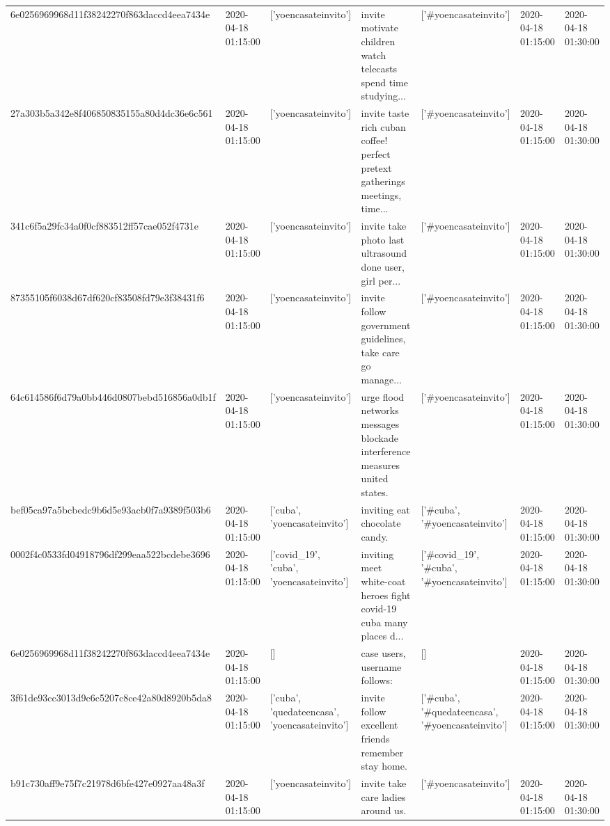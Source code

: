 \begin{tabular}{lllllll}
6e0256969968d11f38242270f863daccd4eea7434e & 2020-04-18 01:15:00 & ['yoencasateinvito'] & invite motivate children watch telecasts spend time studying... & ['#yoencasateinvito'] & 2020-04-18 01:15:00 & 2020-04-18 01:30:00 \\
27a303b5a342e8f406850835155a80d4dc36e6c561 & 2020-04-18 01:15:00 & ['yoencasateinvito'] & invite taste rich cuban coffee! perfect pretext gatherings meetings, time... & ['#yoencasateinvito'] & 2020-04-18 01:15:00 & 2020-04-18 01:30:00 \\
341c6f5a29fc34a0f0cf883512ff57cae052f4731e & 2020-04-18 01:15:00 & ['yoencasateinvito'] & invite take photo last ultrasound done user, girl per... & ['#yoencasateinvito'] & 2020-04-18 01:15:00 & 2020-04-18 01:30:00 \\
87355105f6038d67df620cf83508fd79e3f38431f6 & 2020-04-18 01:15:00 & ['yoencasateinvito'] & invite follow government guidelines, take care go manage... & ['#yoencasateinvito'] & 2020-04-18 01:15:00 & 2020-04-18 01:30:00 \\
64c614586f6d79a0bb446d0807bebd516856a0db1f & 2020-04-18 01:15:00 & ['yoencasateinvito'] & urge flood networks messages blockade interference measures united states. & ['#yoencasateinvito'] & 2020-04-18 01:15:00 & 2020-04-18 01:30:00 \\
bef05ca97a5bcbedc9b6d5e93acb0f7a9389f503b6 & 2020-04-18 01:15:00 & ['cuba', 'yoencasateinvito'] & inviting eat chocolate candy. & ['#cuba', '#yoencasateinvito'] & 2020-04-18 01:15:00 & 2020-04-18 01:30:00 \\
0002f4c0533fd04918796df299eaa522bcdebe3696 & 2020-04-18 01:15:00 & ['covid_19', 'cuba', 'yoencasateinvito'] & inviting meet white-coat heroes fight covid-19 cuba many places d... & ['#covid_19', '#cuba', '#yoencasateinvito'] & 2020-04-18 01:15:00 & 2020-04-18 01:30:00 \\
6e0256969968d11f38242270f863daccd4eea7434e & 2020-04-18 01:15:00 & [] & case users, username follows: & [] & 2020-04-18 01:15:00 & 2020-04-18 01:30:00 \\
3f61de93cc3013d9c6c5207c8ce42a80d8920b5da8 & 2020-04-18 01:15:00 & ['cuba', 'quedateencasa', 'yoencasateinvito'] & invite follow excellent friends remember stay home. & ['#cuba', '#quedateencasa', '#yoencasateinvito'] & 2020-04-18 01:15:00 & 2020-04-18 01:30:00 \\
b91c730aff9e75f7c21978d6bfe427e0927aa48a3f & 2020-04-18 01:15:00 & ['yoencasateinvito'] & invite take care ladies around us. & ['#yoencasateinvito'] & 2020-04-18 01:15:00 & 2020-04-18 01:30:00 \\

\end{tabular}
